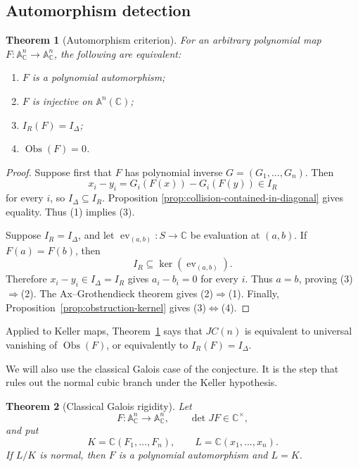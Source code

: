 \documentclass[11pt]{article}
\newtheorem{theorem}{Theorem}[section]
\theoremstyle{remark}
\newcommand{\A}{\mathbb A}
\newcommand{\C}{\mathbb C}
\newcommand{\Obs}{\operatorname{Obs}}
\begin{document}
\subsection{Automorphism detection}
\label{sec:automorphism-detection}

\begin{theorem}[Automorphism criterion]
\label{thm:automorphism-criterion}
For an arbitrary polynomial map
\(F\colon\A^n_{\C}\to\A^n_{\C}\), the following are equivalent:
\begin{enumerate}[label=\textup{(\arabic*)}]
  \item \(F\) is a polynomial automorphism;
  \item \(F\) is injective on \(\A^n(\C)\);
  \item \(I_R(F)=I_\Delta\);
  \item \(\Obs(F)=0\).
\end{enumerate}
\end{theorem}

\begin{proof}
Suppose first that \(F\) has polynomial inverse
\(G=(G_1,\dots,G_n)\).  Then
\[
  x_i-y_i
  =
  G_i(F(x))-G_i(F(y))
  \in I_R
\]
for every \(i\), so \(I_\Delta\subseteq I_R\).  Proposition
\ref{prop:collision-contained-in-diagonal} gives equality.  Thus
\textup{(1)} implies \textup{(3)}.

Suppose \(I_R=I_\Delta\), and let
\(\operatorname{ev}_{(a,b)}\colon S\to\C\) be evaluation at
\((a,b)\).  If \(F(a)=F(b)\), then
\[
  I_R\subseteq\ker(\operatorname{ev}_{(a,b)}).
\]
Therefore \(x_i-y_i\in I_\Delta=I_R\) gives \(a_i-b_i=0\) for every
\(i\).  Thus \(a=b\), proving
\textup{(3)}\(\Rightarrow\)\textup{(2)}.  The
Ax--Grothendieck theorem \cite{Ax1969} gives
\textup{(2)}\(\Rightarrow\)\textup{(1)}.  Finally,
Proposition~\ref{prop:obstruction-kernel} gives
\textup{(3)}\(\Longleftrightarrow\)\textup{(4)}.
\end{proof}

Applied to Keller maps, Theorem~\ref{thm:automorphism-criterion} says
that \(JC(n)\) is equivalent to universal vanishing of \(\Obs(F)\), or
equivalently to \(I_R(F)=I_\Delta\).

We will also use the classical Galois case of the conjecture.  It is the
step that rules out the normal cubic branch under the Keller hypothesis.

\begin{theorem}[Classical Galois rigidity]
\label{thm:classical-galois-rigidity}
Let
\[
  F\colon\A^n_{\C}\longrightarrow\A^n_{\C},
  \qquad \det JF\in\C^\times,
\]
and put
\[
  K=\C(F_1,\dots,F_n),
  \qquad
  L=\C(x_1,\dots,x_n).
\]
If \(L/K\) is normal, then \(F\) is a polynomial automorphism and
\(L=K\).
\end{theorem}
\end{document}
